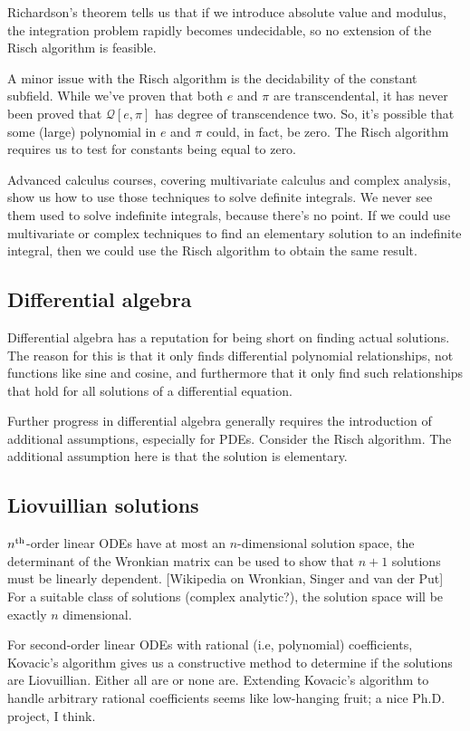\documentclass{article}
\begin{document}
Richardson's theorem tells us that if we introduce absolute value and modulus,
the integration problem rapidly becomes undecidable, so no extension of the
Risch algorithm is feasible.

A minor issue with the Risch algorithm is the decidability of the
constant subfield.  While we've proven that both $e$ and $\pi$ are transcendental,
it has never been proved that ${\mathcal Q}[e,\pi]$ has degree of transcendence two.
So, it's possible that some (large) polynomial in $e$ and $\pi$ could, in fact,
be zero.  The Risch algorithm requires us to test for constants being equal to zero.

Advanced calculus courses, covering multivariate calculus and complex analysis,
show us how to use those techniques to solve definite integrals.  We never
see them used to solve indefinite integrals, because there's no point.
If we could use multivariate or complex techniques to find an elementary
solution to an indefinite integral, then we could use the Risch algorithm
to obtain the same result.

\subsection*{Differential algebra}

Differential algebra has a reputation for being short on finding actual solutions.
The reason for this is that it only finds differential polynomial relationships,
not functions like sine and cosine, and furthermore that it only find such relationships
that hold for all solutions of a differential equation.

Further progress in differential algebra generally requires the introduction of
additional assumptions, especially for PDEs.  Consider
the Risch algorithm.  The additional assumption here is that the solution is elementary.

\subsection*{Liovuillian solutions}

$n^{\rm th}$-order linear ODEs have at most an $n$-dimensional solution space,
the determinant of the Wronkian matrix can be used to show that $n+1$ solutions
must be linearly dependent.  [Wikipedia on Wronkian, Singer and van der Put]
For a suitable class of solutions (complex analytic?), the solution space
will be exactly $n$ dimensional.

For second-order linear ODEs with rational (i.e, polynomial) coefficients,
Kovacic's algorithm gives us a constructive method to determine if
the solutions are Liovuillian.  Either all are or none are.
Extending Kovacic's algorithm to handle arbitrary rational coefficients
seems like low-hanging fruit; a nice Ph.D. project, I think.
\end{document}
